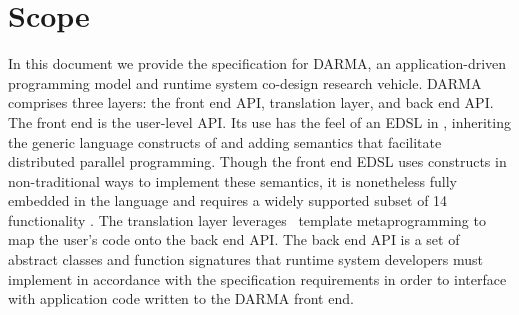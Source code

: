 \section{Scope}\label{sec:scope}
In this document we provide the specification for \gls{DARMA},
an application-driven \gls{programming model} and \gls{runtime system} co-design 
research vehicle.
\gls{DARMA} comprises three layers: the \gls{front end} \gls{API},
\gls{translation layer}, and
\gls{back end} \gls{API}. 
The \gls{front end} is the user-level \gls{API}. 
Its use has the feel of an \gls{EDSL} in \CC,  inheriting the generic
language constructs of \CC and adding \gls{semantics} that facilitate
distributed parallel programming.  Though the \gls{front end} \gls{EDSL} uses
\CC constructs in non-traditional ways to implement these semantics, it is
nonetheless fully embedded in the \CC language and 
requires a widely supported subset of \CC{}14 functionality \compilerReqs.
The \gls{translation layer} leverages \CC\ \gls{template
metaprogramming} to map the user's code onto the \gls{back end} \gls{API}.
The \gls{back end} \gls{API} is a set of abstract classes and function
signatures that \gls{runtime system} developers must implement in accordance with the
specification requirements in order to interface with application code written
to the \gls{DARMA} \gls{front end}.  


